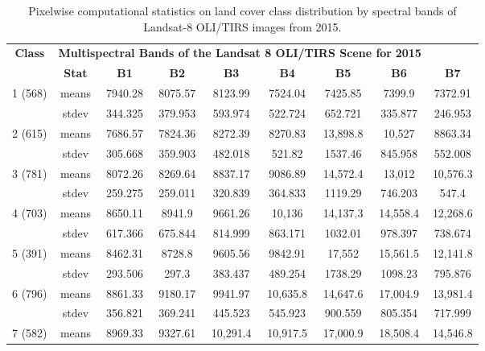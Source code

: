 \documentclass[jmse,article,accept,pdftex,oneauthor]{Definitions/mdpi}
\begin{document}
\begin{table}[H]

  \caption{Pixelwise computational statistics on land cover class distribution by spectral bands of Landsat-8 OLI/TIRS images from 2015. \label{tab04}}
\small
 \setlength{\tabcolsep}{2.28mm}
   \begin{tabular}{ccccccccc}
  \toprule
  \multirow{2}{*}{\textbf{Class}} & \multicolumn{7}{c}{\textbf{Multispectral Bands of the Landsat 8 OLI/TIRS Scene for} \textbf{2015}} \\
    & \textbf{Stat} & \textbf{B1} & \textbf{B2} & \textbf{B3} & \textbf{B4} & \textbf{B5} & \textbf{B6} & \textbf{B7} \\
    \midrule
    \multirow{2}{*}{1 (568)} & means & 7940.28 & 8075.57 & 8123.99 & 7524.04 & 7425.85 & 7399.9 &7372.91 \\
    & stdev & 344.325 & 379.953 & 593.974 & 522.724 & 652.721 & 335.877 & 246.953 \\
    \midrule
    \multirow{2}{*}{2 (615)} & means & 7686.57 & 7824.36 & 8272.39 & 8270.83 & 13,898.8 & 10,527 & 8863.34 \\
    & stdev & 305.668 & 359.903 & 482.018 & 521.82 & 1537.46 & 845.958 & 552.008 \\
    \midrule
    \multirow{2}{*}{3 (781)} & means & 8072.26 & 8269.64 & 8837.17 & 9086.89 & 14,572.4 & 13,012 & 10,576.3 \\
    & stdev & 259.275 & 259.011 & 320.839 & 364.833 & 1119.29 & 746.203 & 547.4 \\
    \midrule
    \multirow{2}{*}{4 (703)} & means & 8650.11 &8941.9 & 9661.26 & 10,136 & 14,137.3 & 14,558.4 & 12,268.6 \\
    & stdev & 617.366 & 675.844 & 814.999 & 863.171 & 1032.01 & 978.397 & 738.674 \\
    \midrule
    \multirow{2}{*}{5 (391)} & means & 8462.31 & 8728.8 & 9605.56 & 9842.91 & 17,552 & 15,561.5 & 12,141.8 \\
    & stdev & 293.506 & 297.3 & 383.437 & 489.254 & 1738.29 & 1098.23 & 795.876 \\
    \midrule
    \multirow{2}{*}{6 (796)} & means & 8861.33 & 9180.17 & 9941.97 & 10,635.8 & 14,647.6 & 17,004.9 & 13,981.4 \\
    & stdev & 356.821 & 369.241 & 445.523 & 545.923 & 900.559 & 805.354 & 717.999 \\
    \midrule
    \multirow{2}{*}{7 (582)} & means & 8969.33 & 9327.61 & 10,291.4 & 10,917.5 & 17,000.9 & 18,508.4 & 14,546.8 \\

\end{tabular}
\end{table}
\end{document}
